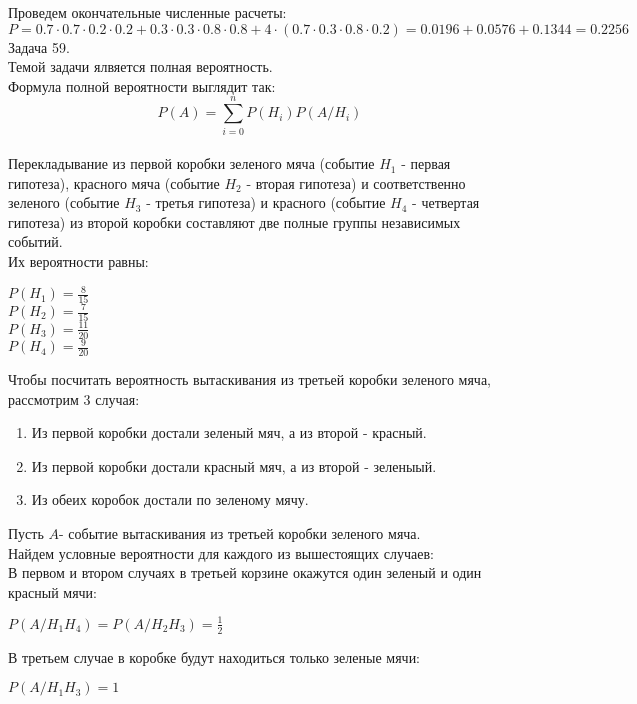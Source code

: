 Проведем окончательные численные расчеты:\\
$P=0.7\cdot 0.7\cdot 0.2\cdot 0.2+0.3\cdot 0.3\cdot 0.8\cdot 0.8+4\cdot(0.7\cdot 0.3\cdot 0.8\cdot 0.2)=0.0196+0.0576+0.1344=0.2256$\\

Задача 59.\\
Темой задачи ялвяется полная вероятность.\\
Формула полной вероятности выглядит так:\\
$$P(A)=\sum_{i=0}^{n} P(H_i)P(A/H_i)$$\\
Перекладывание из первой коробки зеленого мяча (событие $H_1$ - первая гипотеза), красного мяча (событие $H_2$ - вторая гипотеза) и соответственно зеленого (событие $H_3$ - третья гипотеза) и красного (событие $H_4$ - четвертая гипотеза) из второй коробки составляют две полные группы независимых событий.\\
Их вероятности равны:\\
\begin{center}
$P(H_1)=\frac{8}{15}$\\
$P(H_2)=\frac{7}{15}$\\
$P(H_3)=\frac{11}{20}$\\
$P(H_4)=\frac{9}{20}$\\
\end{center}
Чтобы посчитать вероятность вытаскивания из третьей коробки зеленого мяча, рассмотрим 3 случая:\\
\begin{enumerate}
\item Из первой коробки достали зеленый мяч, а из второй - красный.
\item Из первой коробки достали красный мяч, а из второй - зеленыый.
\item Из обеих коробок достали по зеленому мячу.
\end{enumerate}
Пусть $A$- событие вытаскивания из третьей коробки зеленого мяча.\\
Найдем условные вероятности для каждого из вышестоящих случаев:\\
В первом и втором случаях в третьей корзине окажутся один зеленый и один красный мячи:\\
\begin{center}
$P(A/H_1 H_4)=P(A/H_2 H_3)=\frac{1}{2}$\\
\end{center}
В третьем случае в коробке будут находиться только зеленые мячи:\\
\begin{center}
$P(A/H_1 H_3)=1$\\
\end{center}
